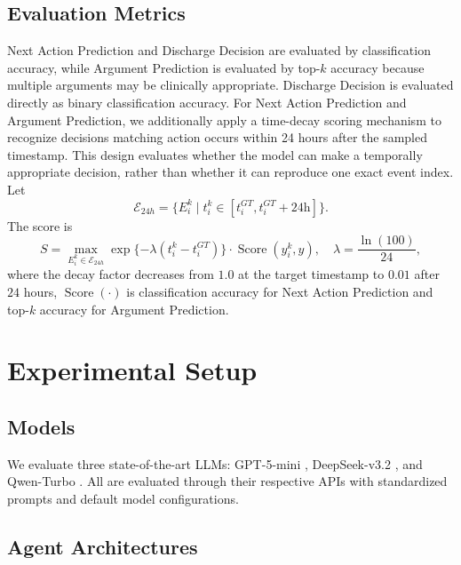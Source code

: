 \subsection{Evaluation Metrics}

Next Action Prediction and Discharge Decision are evaluated by classification accuracy, while Argument Prediction is evaluated by top-$k$ accuracy because multiple arguments may be clinically appropriate. Discharge Decision is evaluated directly as binary classification accuracy. For Next Action Prediction and Argument Prediction, we additionally apply a time-decay scoring mechanism to recognize decisions matching action occurs within 24 hours after the sampled timestamp. This design evaluates whether the model can make a temporally appropriate decision, rather than whether it can reproduce one exact event index. Let
\[
\mathcal{E}_{24h}=\{E_i^k \mid t_i^k\in[t_i^{GT},t_i^{GT}+24\mathrm{h}]\}.
\]
The score is
\[
S=\max_{E_i^k\in\mathcal{E}_{24h}}
\exp\{-\lambda(t_i^k-t_i^{GT})\}\cdot\operatorname{Score}(y_i^k,\hat{y}),
\quad
\lambda=\frac{\ln(100)}{24},
\]
where the decay factor decreases from $1.0$ at the target timestamp to $0.01$ after $24$ hours, $\operatorname{Score}(\cdot)$ is classification accuracy for Next Action Prediction and top-$k$ accuracy for Argument Prediction. 

\section{Experimental Setup}
\label{sec:expsetup}

\subsection{Models}

We evaluate three state-of-the-art LLMs: GPT-5-mini \cite{gpt52}, DeepSeek-v3.2 \cite{deepseekai2025deepseekv32}, and Qwen-Turbo \cite{qwen3}. All are evaluated through their respective APIs with standardized prompts and default model configurations.

\subsection{Agent Architectures}


